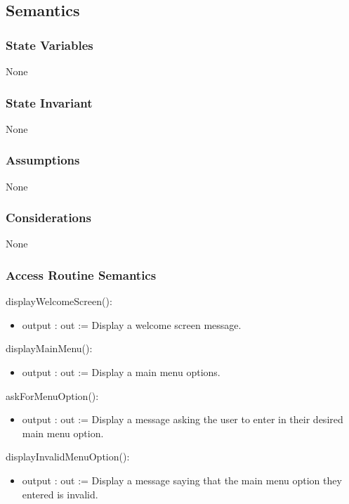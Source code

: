 \documentclass[12pt, titlepage]{article}
\begin{document}
    \subsection* {Semantics}
    
    \subsubsection* {State Variables}
        None
        
    \subsubsection* {State Invariant}
        None
    
    \subsubsection* {Assumptions}
        None
    
    \subsubsection* {Considerations}
        None
    
    \subsubsection* {Access Routine Semantics}
        
        \noindent displayWelcomeScreen():
        \begin{itemize}
        \item output : out := Display a welcome screen message.
        \end{itemize}
        
        \noindent displayMainMenu():
        \begin{itemize}
        \item output : out := Display a main menu options.
        \end{itemize}
        
        \noindent askForMenuOption():
        \begin{itemize}
        \item output : out := Display a message asking the user to enter in their desired main menu option.
        \end{itemize}
        
        \noindent displayInvalidMenuOption():
        \begin{itemize}
        \item output : out := Display a message saying that the main menu option they entered is invalid.
        \end{itemize}
        
\end{document}
